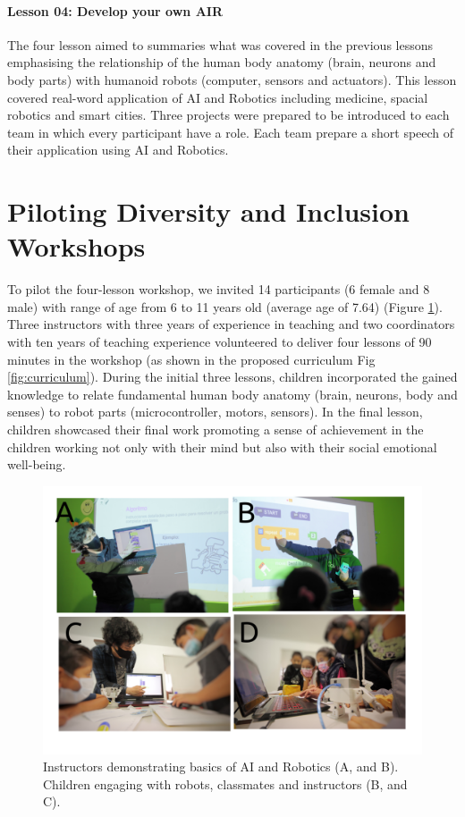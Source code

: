\documentclass[conference]{IEEEtran}
\begin{document}
\paragraph{Lesson 04: Develop your own AIR}
The four lesson aimed to summaries what was covered in the previous lessons emphasising the relationship of the human body anatomy (brain, neurons and body parts) with humanoid robots (computer, sensors and actuators).
This lesson covered real-word application of AI and Robotics including medicine, spacial robotics and smart cities. 
Three projects were prepared to be introduced to each team in which every participant have a role. 
Each team prepare a short speech of their application using AI and Robotics. 
\section{Piloting Diversity and Inclusion Workshops}
To pilot the four-lesson workshop, we invited 14 participants (6 female and 8 male) with range of age from 6 to 11 years old (average age of 7.64) (Figure \ref{fig:pilot}). 
Three instructors with three years of experience in teaching and two coordinators with ten years of teaching experience volunteered to deliver four lessons of 90 minutes in the workshop (as shown in the proposed curriculum Fig \ref{fig:curriculum}).
During the initial three lessons, children incorporated the gained knowledge to relate fundamental human body anatomy (brain, neurons, body and senses) to robot parts (microcontroller, motors, sensors). In the final lesson, children showcased their final work promoting a sense of achievement in the children working not only with their mind but also with their social emotional well-being. 

\begin{figure}[tbp]
    \includegraphics[width=\linewidth]{piloting-workshops/versions/drawing-v00.png} %
    \caption{
        Instructors demonstrating basics of AI and Robotics (A, and B). 
        Children engaging with robots, classmates and instructors (B, and C).
        }
    \label{fig:pilot}
\end{figure}
\end{document}
